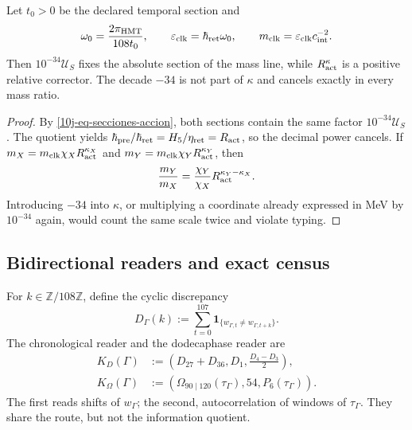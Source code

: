 \begin{proposition}
\label{10j-prop-escala-corrector}
Let \(t_0>0\) be the declared temporal section and
\begin{equation}
 \omega_0=\frac{2\pi_{\rm HMT}}{108t_0},
 \qquad \varepsilon_{\rm clk}=\hbar_{\rm ret}\omega_0,
 \qquad m_{\rm clk}=\varepsilon_{\rm clk}c_{\rm int}^{-2}.
 \label{10j-eq-reloj-masa}
\end{equation}
Then \(10^{-34}\mathcal U_S\) fixes the absolute section of the mass line, while \(R_{\rm act}^{\kappa}\) is a positive relative corrector. The decade \(-34\) is not part of \(\kappa\) and cancels exactly in every mass ratio.
\end{proposition}

\begin{proof}
By \eqref{10j-eq-secciones-accion}, both sections contain the same factor \(10^{-34}\mathcal U_S\). The quotient yields \(\hbar_{\rm pre}/\hbar_{\rm ret}=H_5/\eta_{\rm ret}=R_{\rm act}\), so the decimal power cancels. If \(m_X=m_{\rm clk}\chi_XR_{\rm act}^{\kappa_X}\) and \(m_Y=m_{\rm clk}\chi_YR_{\rm act}^{\kappa_Y}\), then
\[
 \frac{m_Y}{m_X}
 =\frac{\chi_Y}{\chi_X}
  R_{\rm act}^{\kappa_Y-\kappa_X}.
\]
Introducing \(-34\) into \(\kappa\), or multiplying a coordinate already expressed in MeV by \(10^{-34}\) again, would count the same scale twice and violate typing.
\end{proof}

\subsection{Bidirectional readers and exact census}

For \(k\in\mathbb Z/108\mathbb Z\), define the cyclic discrepancy
\begin{equation}
 D_\Gamma(k):=
 \sum_{t=0}^{107}
 \mathbf1_{\{w_{\Gamma,t}\ne w_{\Gamma,t+k}\}}.
 \label{10j-eq-discrepancia}
\end{equation}
The chronological reader and the dodecaphase reader are
\begin{align}
 K_D(\Gamma)
 &:=\left(D_{27}+D_{36},D_1,\frac{D_4-D_3}{2}\right),
 \label{10j-eq-kd}\\
 K_\Omega(\Gamma)
 &:=(\Omega_{90\mid120}(\tau_\Gamma),54,P_6(\tau_\Gamma)).
 \label{10j-eq-komega}
\end{align}
The first reads shifts of \(w_\Gamma\); the second, autocorrelation of windows of \(\tau_\Gamma\). They share the route, but not the information quotient.

